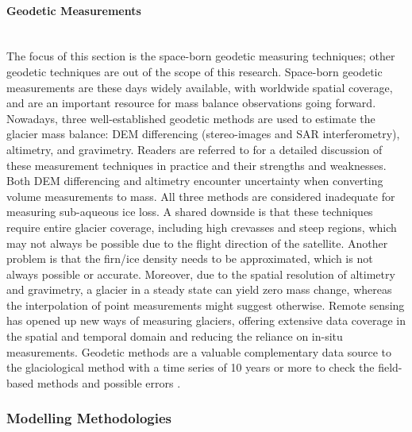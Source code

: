 \paragraph{Geodetic Measurements}\mbox{}\vspace{2mm}  \\ 
The focus of this section is the space-born geodetic measuring techniques; other geodetic techniques are out of the scope of this research. Space-born geodetic measurements are these days widely available, with worldwide spatial coverage, and are an important resource for mass balance observations going forward. Nowadays, three well-established geodetic methods are used to estimate the glacier mass balance: DEM differencing (stereo-images and SAR interferometry), altimetry, and gravimetry. Readers are referred to \cite{berthier-2023} for a detailed discussion of these measurement techniques in practice and their strengths and weaknesses. Both DEM differencing and altimetry encounter uncertainty when converting volume measurements to mass. All three methods are considered inadequate for measuring sub-aqueous ice loss. A shared downside is that these techniques require entire glacier coverage, including high crevasses and steep regions, which may not always be possible due to the flight direction of the satellite. Another problem is that the firn/ice density needs to be approximated, which is not always possible or accurate. Moreover, due to the spatial resolution of altimetry and gravimetry, a glacier in a steady state can yield zero mass change, whereas the interpolation of point measurements might suggest otherwise. Remote sensing has opened up new ways of measuring glaciers, offering extensive data coverage in the spatial and temporal domain and reducing the reliance on in-situ measurements. Geodetic methods are a valuable complementary data source to the glaciological method with a time series of 10 years or more to check the field-based methods and possible errors \cite{kaser-2003}. 

\subsubsection{Modelling Methodologies}

